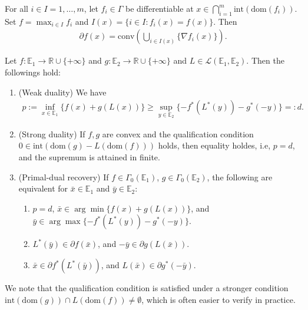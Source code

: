 \documentclass{tufte-handout}
\begin{document}
\begin{Corollary}
    For all \( i \in I={1,\ldots,m} \), let \( f_i \in \Gamma\) be 
    differentiable at \( x \in \bigcap_{i=1}^m \text{int}(\text{dom}(f_i)) \).
    Set \( f = \max_{i\in I} f_i \) and \(I(x) = \{ i \in I : f_i(x) = f(x) \} \). Then
    \begin{align}
        \partial f(x) = \text{conv}\left( \bigcup_{i\in I(x)} \{\nabla f_i(x)\} \right).
    \end{align}
\end{Corollary}

\begin{Theorem}
    Let \( f: \mathbb{E}_1 \to \mathbb{R}\cup \{+\infty\} \) and \( g: \mathbb{E}_2 \to \mathbb{R}\cup \{+\infty\} \)
and \( L \in \mathcal{L}(\mathbb{E}_1, \mathbb{E}_2) \). Then the followings hold:
    \begin{enumerate}
        \item (Weak duality)
        We have 
        \begin{align}
            p := \inf_{x\in \mathbb{E}_1}\{f(x) + g(L(x))\} \geq \sup_{y\in \mathbb{E}_2}\{-f^*(L^*(y)) - g^*(-y)\} =: d.
        \end{align}
        \item (Strong duality) If \( f,g \) are convex and the qualification condition \( 0 \in \text{int}(\text{dom}(g) - L(\text{dom}(f))) \) holds, 
        then equality holdes, i.e, \( p = d \), and the supremum is attained in finite.
        \item (Primal-dual recovery) If \( f\in \Gamma_0(\mathbb{E}_1) \), \( g \in \Gamma_0(\mathbb{E}_2) \),
        the following are equivalent for \( \bar x \in \mathbb{E}_1 \) and \( \bar y \in \mathbb{E}_2 \):
        \begin{enumerate}
            \item \( p=d \), \( \bar x \in \arg\min\{f(x) + g(L(x))\}\), and \( \bar y \in \arg\max\{-f^*(L^*(y)) - g^*(-y)\} \).
            \item \( L^*(\bar y)\in \partial f (\bar x) \), and \( -\bar y \in \partial g(L(\bar x)) \).
            \item \(\bar x \in \partial f^*(L^*(\bar y)) \), and \( L(\bar x) \in \partial g^*(-\bar y) \).
    \end{enumerate}
    \end{enumerate}
\end{Theorem}
We note that the qualification condition is satisfied under a stronger condition 
\( \text{int}(\text{dom}(g)) \cap L(\text{dom}(f)) \neq \emptyset \), which is often easier to verify in practice.
\end{document}
